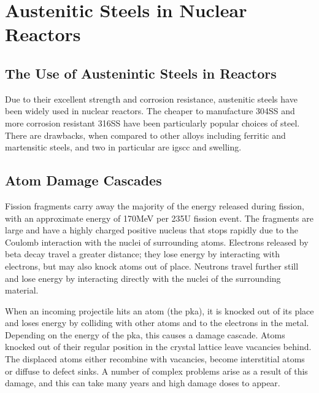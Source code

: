 


\section[Use In Reactors]{Austenitic Steels in Nuclear Reactors}

\subsection{The Use of Austenintic Steels in Reactors}

Due to their excellent strength and corrosion resistance, austenitic steels have been widely used in nuclear reactors.  The cheaper to manufacture \gls{304SS} and more corrosion resistant \gls{316SS} have been particularly popular choices of steel.  There are drawbacks, when compared to other alloys including ferritic and martensitic steels, and two in particular are \acrshort{igscc} and swelling.



\subsection{Atom Damage Cascades}

Fission fragments carry away the majority of the energy released during fission, with an approximate energy of 170MeV per 235U fission event.  The fragments are large and have a highly charged positive nucleus that stops rapidly due to the Coulomb interaction with the nuclei of surrounding atoms.  Electrons released by beta decay travel a greater distance; they lose energy by interacting with electrons, but may also knock atoms out of place.  Neutrons travel further still and lose energy by interacting directly with the nuclei of the surrounding material.

When an incoming projectile hits an atom (the \acrfull{pka}), it is knocked out of its place and loses energy by colliding with other atoms and to the electrons in the metal.  Depending on the energy of the \acrshort{pka}, this causes a damage cascade.  Atoms knocked out of their regular position in the crystal lattice leave vacancies behind.  The displaced atoms either recombine with vacancies, become interstitial atoms or diffuse to defect sinks.  A number of complex problems arise as a result of this damage, and this can take many years and high damage doses to appear.


